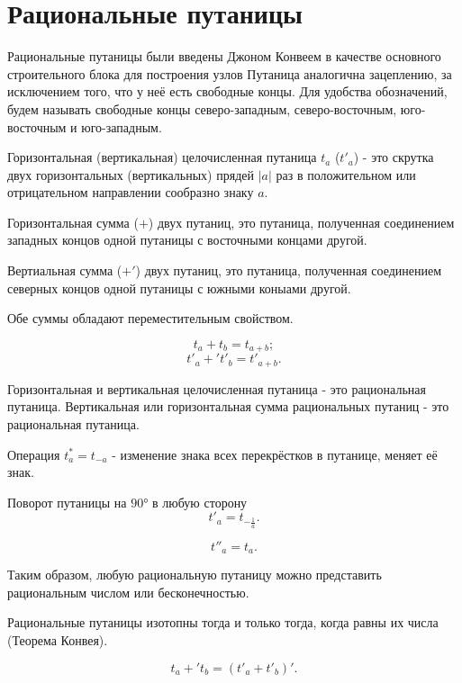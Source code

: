 \section{Рациональные путаницы}

Рациональные путаницы были введены Джоном Конвеем в качестве основного строительного блока для построения узлов
Путаница аналогична зацеплению, за исключением того, что у неё есть свободные концы. Для удобства обозначений, будем называть свободные концы северо-западным, северо-восточным, юго-восточным и юго-западным.


Горизонтальная (вертикальная) целочисленная путаница $t_a$ ($t'_a$) - это скрутка двух горизонтальных (вертикальных) прядей $|a|$ раз в положительном или отрицательном направлении сообразно знаку $a$.

Горизонтальная сумма ($+$) двух путаниц, это путаница, полученная соединением западных концов одной путаницы с восточными концами другой.

Вертиальная сумма ($+'$) двух путаниц, это путаница, полученная соединением северных концов одной путаницы с южными коныами другой.

Обе суммы обладают переместительным свойством.

$$t_a + t_b = t_{a+b};$$
$$t'_a +' t'_b =t'_{a+b}.$$

Горизонтальная и вертикальная целочисленная путаница - это рациональная путаница.
Вертикальная или горизонтальная сумма рациональных путаниц - это рациональная путаница.

Операция $t^*_a = t_{-a}$ - изменение знака всех перекрёстков в путанице, меняет её знак.

Поворот путаницы на $90°$ в любую сторону 
$$t'_a = t_{-\frac{1}{a}}.$$

$$t''_a = t_a.$$

Таким образом, любую рациональную путаницу можно представить рациональным числом или бесконечностью.

Рациональные путаницы изотопны тогда и только тогда, когда равны их числа (Теорема Конвея).

$$t_a +' t_b = (t'_a + t'_b)'.$$